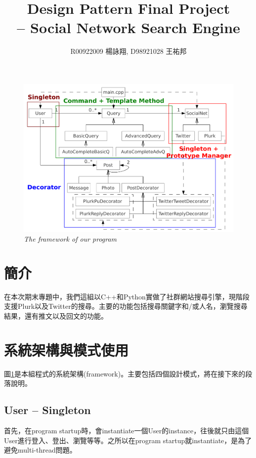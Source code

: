 \documentclass[12pt]{article}
\title{Design Pattern Final Project\\-- Social Network Search Engine}
\author{R00922009 楊詠翔, D98921028 王祐邦}
\begin{document}
\maketitle

\begin{figure}[t]
\centering
\includegraphics[width=15cm]{classDiagram+DP.pdf}
\caption{{\it The framework of our program}}
\label{fig:classDiagram}
\end{figure}

\section{簡介}

在本次期末專題中，我們這組以C++和Python實做了社群網站搜尋引擎，現階段支援Plurk以及Twitter的搜尋。主要的功能包括搜尋關鍵字和/或人名，瀏覽搜尋結果，還有推文以及回文的功能。

\section{系統架構與模式使用}

圖\ref{fig:classDiagram}是本組程式的系統架構(framework)。主要包括四個設計模式，將在接下來的段落說明。

\subsection{User -- Singleton}

首先，在program startup時，會instantiate一個User的instance，往後就只由這個User進行登入、登出、瀏覽等等。之所以在program startup就instantiate，是為了避免multi-thread問題。
\end{document}
